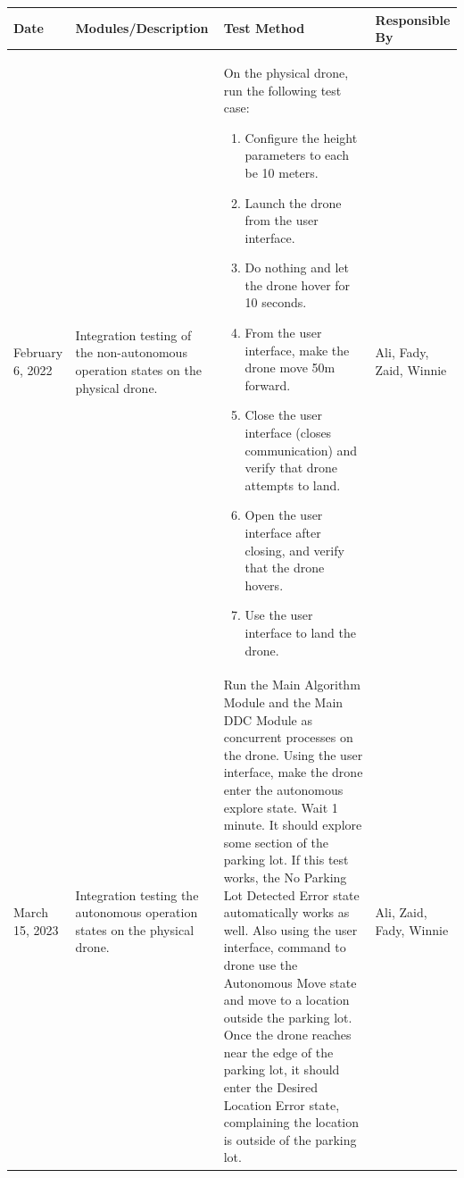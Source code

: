\documentclass[12pt, titlepage]{article}
\begin{document}
\begin{table}[!h]
\begin{center}
\begin{tabular}{ | m{2.5cm} | m{4cm} | m{6.5cm} | m{2cm} | } 
\hline
Date & Modules/Description & Test Method & Responsible By \\
\hline
February 6, 2022 & Integration testing of the non-autonomous operation states on the physical drone. & 
    On the physical drone, run the following test case: 
    \begin{enumerate}
    \item Configure the height parameters to each be 10 meters.
    \item Launch the drone from the user interface.
    \item Do nothing and let the drone hover for 10 seconds.
    \item From the user interface, make the drone move 50m forward.
    \item Close the user interface (closes communication) and verify that drone attempts to land.
    \item Open the user interface after closing, and verify that the drone hovers.
    \item Use the user interface to land the drone.
    \end{enumerate}
    & Ali, Fady, Zaid, Winnie \\
\hline
March 15, 2023 & Integration testing the autonomous operation states on the physical drone. & 
    Run the Main Algorithm Module and the Main DDC Module as concurrent processes on the drone. Using the user interface, make the drone enter the autonomous explore state. Wait 1 minute. It should explore some section of the parking lot. If this test works, the No Parking Lot Detected Error state automatically works as well. Also using the user interface, command to drone use the Autonomous Move state and move to a location outside the parking lot. Once the drone reaches near the edge of the parking lot, it should enter the Desired Location Error state, complaining the location is outside of the parking lot.  & Ali, Zaid, Fady, Winnie \\
\hline
\end{tabular}
\end{center}
\end{table}

\clearpage

% 
\end{document}
